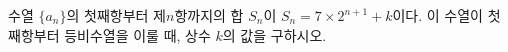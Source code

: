 수열 $\{a_n\}$의 첫째항부터 제$n$항까지의 합 $S_n$이 $S_n=7\times 2^{n+1}+k$이다. 이 수열이 첫째항부터 등비수열을 이룰 때, 상수 $k$의 값을 구하시오.
